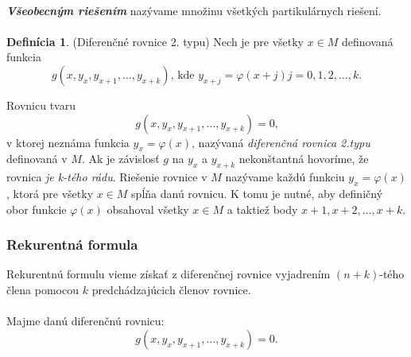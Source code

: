 \documentclass[a4paper,10pt]{article}
\theoremstyle{plain}
\theoremstyle{definition}
\newtheorem{defin}[thm]{Definícia}
\begin{document}
\paragraph{}
\textbf{\textit{Všeobecným riešením}} nazývame množinu všetkých partikulárnych
riešení.

\paragraph{}
\begin{defin}
(Diferenčné rovnice 2. typu)
Nech je pre všetky $x \in M$
definovaná funkcia
$$g(x, y_{x}, y_{x+1}, \ldots, y_{x+k})\text{, kde }y_{x+j} = \varphi(x + j) j = 0, 1, 2, \ldots, k\text{.}$$
\end{defin}

Rovnicu tvaru
$$g(x, y_{x}, y_{x+1}, \ldots, y_{x+k}) = 0\text{,}$$
v ktorej neznáma funkcia $y_{x} = \varphi(x)$, nazývaná \textit{diferenčná rovnica 2.typu}
definovaná v $M$. Ak je závislosť $g$ na $y_{x}$ a $y_{x+k}$ nekonštantná hovoríme,
že rovnica \textit{je k-tého rádu}. Riešenie rovnice v $M$ nazývame každú funkciu
$y_{x} = \varphi(x)$, ktorá pre všetky $x \in M$  spĺňa danú rovnicu. K tomu je nutné,
aby definičný obor funkcie $\varphi(x)$ obsahoval všetky $x \in M$ a taktiež body
$x + 1, x + 2, \ldots, x + k$.
\newpage
\subsubsection{Rekurentná formula}
Rekurentnú formulu vieme získať z diferenčnej rovnice vyjadrením $(n+k)$-tého člena pomocou $k$ predchádzajúcich členov rovnice.

\paragraph{}
Majme danú diferenčnú rovnicu: $$g(x, y_{x}, y_{x+1}, \ldots, y_{x+k}) = 0\text{.}$$
\end{document}
